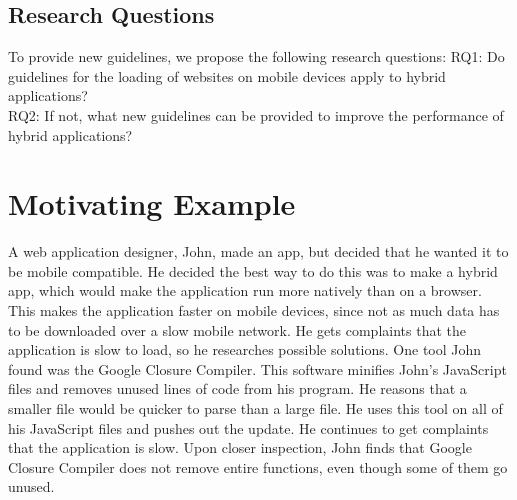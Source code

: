 \documentclass{acm_proc_article-sp}
\begin{document}
\subsection{Research Questions}
To provide new guidelines, we propose the following research questions:
RQ1: Do guidelines for the loading of websites on mobile devices apply to hybrid applications?\\
RQ2: If not, what new guidelines can be provided to improve the performance of hybrid applications?

\section{Motivating Example} 
A web application designer, John, made an app, but decided that he wanted it to be mobile compatible.
He decided the best way to do this was to make a hybrid app, which would make the application run more natively than on a browser.
This makes the application faster on mobile devices, since not as much data has to be downloaded over a slow mobile network.
He gets complaints that the application is slow to load, so he researches possible solutions.
One tool John found was the Google Closure Compiler.
This software minifies John's JavaScript files and removes unused lines of code from his program.
He reasons that a smaller file would be quicker to parse than a large file.
He uses this tool on all of his JavaScript files and pushes out the update.
He continues to get complaints that the application is slow.
Upon closer inspection, John finds that Google Closure Compiler does not remove entire functions, even though some of them go unused.  
\end{document}

